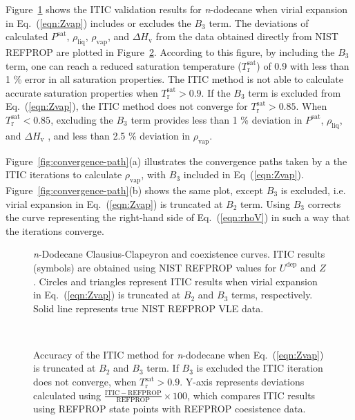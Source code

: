 \documentclass[5p,times]{elsarticle}
\begin{document}
Figure~\ref{fig:NIST-VALIDATION_C12_FTT} shows the ITIC validation results for \textit{n}-dodecane when virial expansion in Eq.~(\ref{eqn:Zvap}) includes or excludes the $B_{3}$ term. The deviations of calculated $P^{\mathrm{sat}}$, $\rho_{\mathrm{liq}}$, $\rho_{\mathrm{vap}}$, and $\Delta H_{\mathrm{v}}$ from the data obtained directly from NIST REFPROP \cite{Lemmon2004} are plotted in Figure~\ref{fig:Nist-Val-Deviation}. According to this figure, by including the $B_3$ term, one can reach a reduced saturation temperature ($T_\mathrm{r}^{\mathrm{sat}}$) of 0.9 with less than 1 \% error in all saturation properties. The ITIC method is not able to calculate accurate saturation properties when $T_\mathrm{r}^{\mathrm{sat}}>0.9$. If the $B_3$ term is excluded from Eq.~(\ref{eqn:Zvap}), the ITIC method does not converge for $T_\mathrm{r}^{\mathrm{sat}} > 0.85$. When $T_\mathrm{r}^{\mathrm{sat}} < 0.85$, excluding the $B_3$ term provides less than 1 \% deviation in $P^{\mathrm{sat}}$, $\rho_{\mathrm{liq}}$, and $\Delta H_{\mathrm{v}}$ , and less than 2.5 \% deviation in $\rho_{\mathrm{vap}}$.

Figure~\ref{fig:convergence-path}(a) illustrates the convergence paths taken by a the ITIC iterations to calculate $\rho_{\mathrm{vap}}$, with $B_3$ included in Eq~(\ref{eqn:Zvap}). Figure~\ref{fig:convergence-path}(b) shows the same plot, except $B_3$ is excluded, i.e. virial expansion in Eq.~(\ref{eqn:Zvap}) is truncated at $B_{2}$ term. Using $B_3$ corrects the curve representing the right-hand side of Eq.~(\ref{eqn:rhoV}) in such a way that the iterations converge.

\begin{figure}
\centering
{}
\caption{\textit{n}-Dodecane Clausius-Clapeyron and coexistence curves. ITIC results (symbols) are obtained using NIST REFPROP \cite{Lemmon2004} values for $U^{\mathrm{dep}}$ and $Z$. Circles and triangles represent ITIC results when virial expansion in Eq.~(\ref{eqn:Zvap}) is truncated at $B_2$ and $B_3$ terms, respectively. Solid line represents true NIST REFPROP VLE data.
}
\label{fig:NIST-VALIDATION_C12_FTT}
\end{figure}


\begin{figure}
\centering
{}
\
\subfloat[]{\texttt{[image: Figures/Nist-Val-Deviation-Hvap.png]}}
\caption{
Accuracy of the ITIC method for \textit{n}-dodecane when Eq.~(\ref{eqn:Zvap}) is truncated at $B_2$ and $B_3$ term. If $B_3$ is excluded the ITIC iteration does not converge, when $T_\mathrm{r}^{\mathrm{sat}}>0.9$. Y-axis represents deviations calculated using $\frac{\mathrm{ITIC - REFPROP}}{\mathrm{REFPROP}} \times 100$, which compares ITIC results using REFPROP state points with REFPROP coesistence data.
}
\label{fig:Nist-Val-Deviation}
\end{figure}
\end{document}
